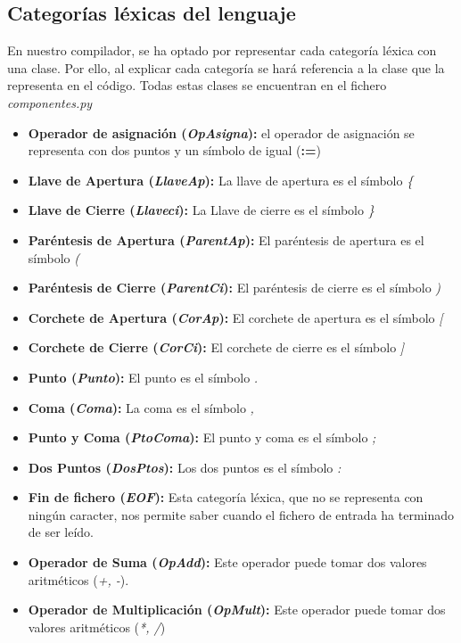 \documentclass[11pt]{article}
\begin{document}
\subsection{Categorías léxicas del lenguaje}
En nuestro compilador, se ha optado por representar cada categoría léxica con una clase. Por ello, al explicar cada categoría se hará referencia a la clase que la representa en el código. Todas estas clases se encuentran en el fichero \textit{componentes.py}
\begin{itemize}
	\item \textbf{Operador de asignación (\textit{OpAsigna}): } el operador de asignación se representa con dos puntos y un símbolo de igual (\textbf{:=})
	\item \textbf{Llave de Apertura (\textit{LlaveAp}): } La llave de apertura es el símbolo \textit{\{}
	\item \textbf{Llave de Cierre (\textit{Llaveci}): } La Llave de cierre es el símbolo \textit{\}}
	\item \textbf{Paréntesis de Apertura (\textit{ParentAp}): } El paréntesis de apertura es el símbolo \textit{(}
	\item \textbf{Paréntesis de Cierre (\textit{ParentCi}): } El paréntesis de cierre es el símbolo \textit{)}
	\item \textbf{Corchete de Apertura (\textit{CorAp}): } El corchete de apertura es el símbolo \textit{[}
	\item \textbf{Corchete de Cierre (\textit{CorCi}): } El corchete de cierre es el símbolo \textit{]}
	\item \textbf{Punto (\textit{Punto}): } El punto es el símbolo \textit{.}
	\item \textbf{Coma (\textit{Coma}): } La coma es el símbolo \textit{,}
	\item \textbf{Punto y Coma (\textit{PtoComa}): } El punto y coma es el símbolo \textit{;}
	\item \textbf{Dos Puntos (\textit{DosPtos}): } Los dos puntos es el símbolo \textit{:}
	\item \textbf{Fin de fichero (\textit{EOF}): } Esta categoría léxica, que no se representa con ningún caracter, nos permite saber cuando el fichero de entrada ha terminado de ser leído.
	\item \textbf{Operador de Suma (\textit{OpAdd}): } Este operador puede tomar dos valores aritméticos (\textit{+, -}).
	\item \textbf{Operador de Multiplicación (\textit{OpMult}): } Este operador puede tomar dos valores aritméticos (\textit{*, /})

\end{itemize}
\end{document}
